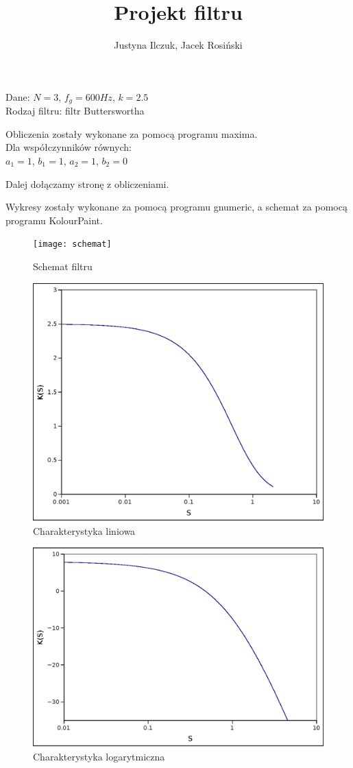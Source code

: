 \documentclass[a4paper,11pt]{article}
\title{Projekt filtru}
\author{Justyna Ilczuk, Jacek Rosiński}
\begin{document}
\maketitle

Dane: 
\( N = 3 \), \( f_g = 600 Hz \), \( k = 2.5 \) \\
Rodzaj filtru:
filtr Butterswortha

Obliczenia zostały wykonane za pomocą programu maxima.  \\
Dla współczynników równych: \\
\(a_1 = 1 \),
\(b_1 = 1 \),
\(a_2 = 1 \),
\(b_2 = 0 \)

Dalej dołączamy stronę z obliczeniami.

Wykresy zostały wykonane za pomocą programu gnumeric, a schemat za pomocą programu KolourPaint.

\begin{figure}
\begin{flushleft}
\texttt{[image: schemat]}
\caption{Schemat filtru}
\end{flushleft}
\end{figure}

\begin{figure}
\includegraphics[scale=1]{charakterystyka_liniowa}
\caption{Charakterystyka liniowa}
\end{figure}

\begin{figure}
\includegraphics[scale=1]{charakterystyka_log}
\caption{Charakterystyka logarytmiczna}
\end{figure}
\end{document}
